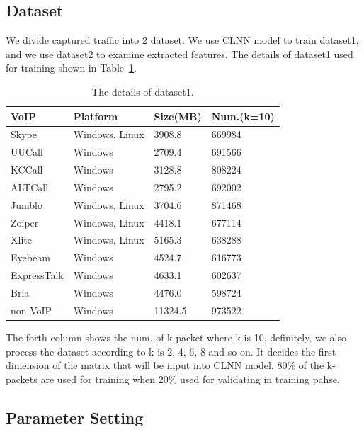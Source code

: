 \documentclass[conference]{IEEEtran}
\begin{document}
\subsection{Dataset}
\label{sec:dataset}
We divide captured traffic into 2 dataset. We use CLNN model to train dataset1, and we use dataset2 to examine extracted features. The details of dataset1 used for training shown in Table~\ref{tab:traffic}.

\begin{table}[htbp]
  \caption{The details of dataset1.}
  \label{tab:traffic}
  \centering
  \begin{tabular}{l l l l}
    \hline
    \textbf{VoIP} & \textbf{Platform} & \textbf{Size(MB)}& \textbf{Num.(k=10)}\\
    \hline
    Skype      & Windows, Linux  & 3908.8  &  669984  \\
    UUCall      & Windows  & 2709.4  &  691566  \\
    KCCall      & Windows  & 3128.8  &  808224  \\
    ALTCall      & Windows  & 2795.2  &  692002  \\
    Jumblo      & Windows, Linux  & 3704.6  &  871468  \\
    Zoiper      & Windows, Linux  & 4418.1  &  677114  \\
    Xlite      & Windows, Linux  & 5165.3  &  638288  \\
    Eyebeam      & Windows  & 4524.7  &  616773  \\
    ExpressTalk      & Windows  & 4633.1  &  602637  \\
    Bria      & Windows  & 4476.0  &  598724  \\
    non-VoIP      & Windows  & 11324.5  &  973522  \\
    \hline
  \end{tabular}
\end{table}

The forth column shows the num. of k-packet where k is 10, definitely, we also process the dataset according to k is 2, 4, 6, 8 and so on. It decides the first dimension of the matrix that will be input into CLNN model. 80\% of the k-packets are used for training when 20\% used for validating in training pahse.

\subsection{Parameter Setting}
\label{sec:params}
\end{document}
